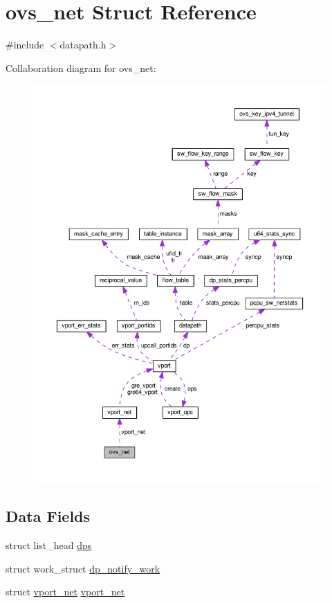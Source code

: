 \hypertarget{structovs__net}{}\section{ovs\+\_\+net Struct Reference}
\label{structovs__net}


{\ttfamily \#include $<$datapath.\+h$>$}



Collaboration diagram for ovs\+\_\+net\+:
\nopagebreak
\begin{figure}[H]
\begin{center}
\leavevmode
\includegraphics[width=350pt]{structovs__net__coll__graph}
\end{center}
\end{figure}
\subsection*{Data Fields}
\begin{DoxyCompactItemize}
\item 
struct list\+\_\+head \hyperlink{structovs__net_a0490101f7ea82f5c290a92d447bd8f9d}{dps}
\item 
struct work\+\_\+struct \hyperlink{structovs__net_ac8cdb834420a37531f032e526ac61901}{dp\+\_\+notify\+\_\+work}
\item 
struct \hyperlink{structvport__net}{vport\+\_\+net} \hyperlink{structovs__net_a78aa4fb59e11c125ba6a61917efe6c50}{vport\+\_\+net}
\end{DoxyCompactItemize}


